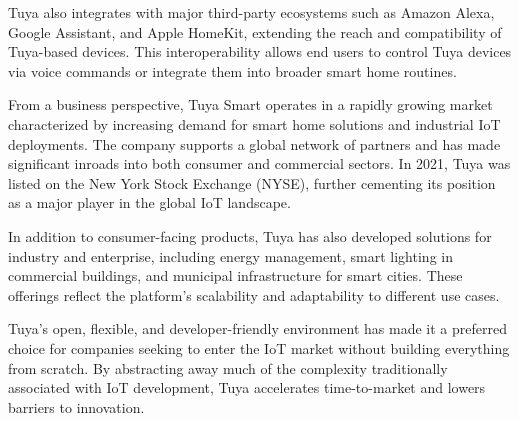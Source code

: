 Tuya also integrates with major third-party ecosystems such as Amazon Alexa, Google Assistant, and Apple HomeKit, extending the reach and compatibility of Tuya-based devices. This interoperability allows end users to control Tuya devices via voice commands or integrate them into broader smart home routines.

From a business perspective, Tuya Smart operates in a rapidly growing market characterized by increasing demand for smart home solutions and industrial IoT deployments. The company supports a global network of partners and has made significant inroads into both consumer and commercial sectors. In 2021, Tuya was listed on the New York Stock Exchange (NYSE), further cementing its position as a major player in the global IoT landscape.

In addition to consumer-facing products, Tuya has also developed solutions for industry and enterprise, including energy management, smart lighting in commercial buildings, and municipal infrastructure for smart cities. These offerings reflect the platform's scalability and adaptability to different use cases.

Tuya's open, flexible, and developer-friendly environment has made it a preferred choice for companies seeking to enter the IoT market without building everything from scratch. By abstracting away much of the complexity traditionally associated with IoT development, Tuya accelerates time-to-market and lowers barriers to innovation.
